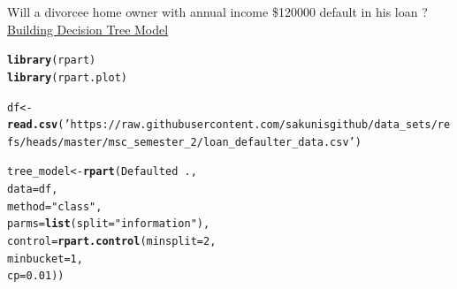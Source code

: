 \documentclass[11pt, a4paper]{article}\usepackage[]{graphicx}\usepackage[]{xcolor}
\makeatletter
\newcommand{\hlnum}[1]{\textcolor[rgb]{0.686,0.059,0.569}{#1}}%
\newcommand{\hlsng}[1]{\textcolor[rgb]{0.192,0.494,0.8}{#1}}%
\newcommand{\hlopt}[1]{\textcolor[rgb]{0,0,0}{#1}}%
\newcommand{\hldef}[1]{\textcolor[rgb]{0.345,0.345,0.345}{#1}}%
\newcommand{\hlkwb}[1]{\textcolor[rgb]{0.69,0.353,0.396}{#1}}%
\newcommand{\hlkwc}[1]{\textcolor[rgb]{0.333,0.667,0.333}{#1}}%
\newcommand{\hlkwd}[1]{\textcolor[rgb]{0.737,0.353,0.396}{\textbf{#1}}}%
\newenvironment{kframe}{%
 \def\at@end@of@kframe{}%
 \ifinner\ifhmode%
  \def\at@end@of@kframe{\end{minipage}}%
  \begin{minipage}{\columnwidth}%
 \fi\fi%
 \def\FrameCommand##1{\hskip\@totalleftmargin \hskip-\fboxsep
 \colorbox{shadecolor}{##1}\hskip-\fboxsep
     \hskip-\linewidth \hskip-\@totalleftmargin \hskip\columnwidth}%
 \MakeFramed {\advance\hsize-\width
   \@totalleftmargin\z@ \linewidth\hsize
   \@setminipage}}%
 {\par\unskip\endMakeFramed%
 \at@end@of@kframe}
\newenvironment{knitrout}{}{} %
\makeatother
\begin{document}
Will a divorcee home owner with annual income \$120000 default in his loan ? \\[1.5em]

\faArrowAltCircleRight[regular] \hspace{0.2cm} \underline{Building Decision Tree Model}

\begin{knitrout}
\color{fgcolor}\begin{kframe}
\begin{alltt}
\hlkwd{library}\hldef{(rpart)}
\hlkwd{library}\hldef{(rpart.plot)}
\end{alltt}
\end{kframe}
\end{knitrout}

\begin{knitrout}\tiny
{}\color{fgcolor}\begin{kframe}
\begin{alltt}
\hldef{df} \hlkwb{<-} \hlkwd{read.csv}\hldef{(}\hlsng{'https://raw.githubusercontent.com/sakunisgithub/data_sets/refs/heads/master/msc_semester_2/loan_defaulter_data.csv'}\hldef{)}
\end{alltt}
\end{kframe}
\end{knitrout}

\newpage

\begin{knitrout}
\color{fgcolor}\begin{kframe}
\begin{alltt}
\hldef{tree_model} \hlkwb{<-} \hlkwd{rpart}\hldef{(Defaulted} \hlopt{~} \hldef{.,}
                    \hlkwc{data} \hldef{= df,}
                    \hlkwc{method} \hldef{=} \hlsng{"class"}\hldef{,}
                    \hlkwc{parms} \hldef{=} \hlkwd{list}\hldef{(}\hlkwc{split} \hldef{=} \hlsng{"information"}\hldef{),}
                    \hlkwc{control} \hldef{=} \hlkwd{rpart.control}\hldef{(}\hlkwc{minsplit} \hldef{=} \hlnum{2}\hldef{,}
                                            \hlkwc{minbucket} \hldef{=} \hlnum{1}\hldef{,}
                                            \hlkwc{cp} \hldef{=} \hlnum{0.01}\hldef{))}
\end{alltt}
\end{kframe}
\end{knitrout}
\end{document}
